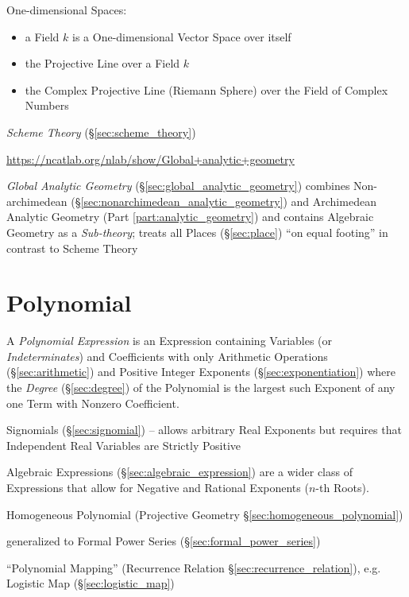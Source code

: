 One-dimensional Spaces:
\begin{itemize}
\item a Field $k$ is a One-dimensional Vector Space over itself
\item the Projective Line over a Field $k$
\item the Complex Projective Line (Riemann Sphere) over the Field of Complex
  Numbers
\end{itemize}

\emph{Scheme Theory} (\S\ref{sec:scheme_theory})

\url{https://ncatlab.org/nlab/show/Global+analytic+geometry}

\emph{Global Analytic Geometry} (\S\ref{sec:global_analytic_geometry}) combines
Non-archimedean (\S\ref{sec:nonarchimedean_analytic_geometry}) and Archimedean
Analytic Geometry (Part \ref{part:analytic_geometry}) and contains Algebraic
Geometry as a \emph{Sub-theory}; treats all Places (\S\ref{sec:place}) ``on
equal footing'' in contrast to Scheme Theory



\section{Polynomial}\label{sec:polynomial}

A \emph{Polynomial Expression} is an Expression containing Variables (or
\emph{Indeterminates}) and Coefficients with only Arithmetic Operations
(\S\ref{sec:arithmetic}) and Positive Integer Exponents
(\S\ref{sec:exponentiation}) where the \emph{Degree} (\S\ref{sec:degree}) of
the Polynomial is the largest such Exponent of any one Term with Nonzero
Coefficient.

\fist Signomials (\S\ref{sec:signomial}) -- allows arbitrary Real Exponents but
requires that Independent Real Variables are Strictly Positive

\fist Algebraic Expressions (\S\ref{sec:algebraic_expression}) are a wider
class of Expressions that allow for Negative and Rational Exponents ($n$-th
Roots).

\fist Homogeneous Polynomial (Projective Geometry
\S\ref{sec:homogeneous_polynomial})

\fist generalized to Formal Power Series (\S\ref{sec:formal_power_series})

\fist ``Polynomial Mapping'' (Recurrence Relation
\S\ref{sec:recurrence_relation}), e.g. Logistic Map (\S\ref{sec:logistic_map})

